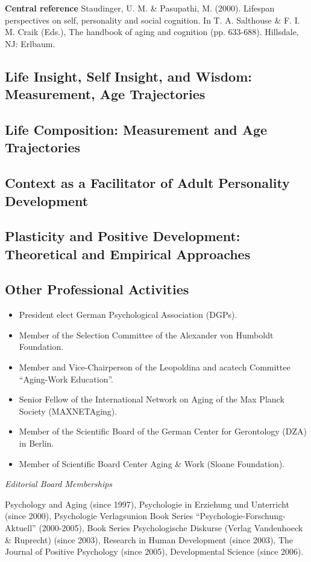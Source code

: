 \textbf{Central reference} Staudinger, U. M. \& Pasupathi, M. (2000). Lifespan perspectives on self, personality and social cognition. In T. A. Salthouse \& F. I. M. Craik (Eds.), The handbook of aging and cognition (pp. 633-688). Hillsdale, NJ: Erlbaum.

\subsection{Life Insight, Self Insight, and
Wisdom: Measurement, Age Trajectories}



\subsection{Life Composition: Measurement and Age Trajectories}



\subsection{Context as a Facilitator of Adult Personality
Development}



\newpage
\subsection{Plasticity and Positive Development: Theoretical and
Empirical Approaches}



\newpage
\subsection{Other Professional Activities}

\begin{itemize}
\item President elect German Psychological Association (DGPs).
\item Member of the Selection Committee of the Alexander von Humboldt Foundation.
\item Member and Vice-Chairperson of the Leopoldina and acatech Committee ``Aging-Work Education''. 
\item Senior Fellow of the International Network on Aging of the Max Planck Society (MAXNETAging).
\item Member of the Scientific Board of the German Center for Gerontology (DZA) in Berlin.
\item Member of Scientific Board Center Aging \& Work (Sloane Foundation).
\end{itemize}



\textit{Editorial Board Memberships}

Psychology and Aging (since 1997), Psychologie in Erziehung und Unterricht (since 2000), Psychologie Verlagsunion Book Series ``Psychologie-Forschung-Aktuell'' (2000-2005), Book Series Psychologische Diskurse (Verlag Vandenhoeck \& Ruprecht) (since 2003), Research in Human Development (since 2003), The Journal of Positive Psychology (since 2005), Developmental Science (since 2006).


